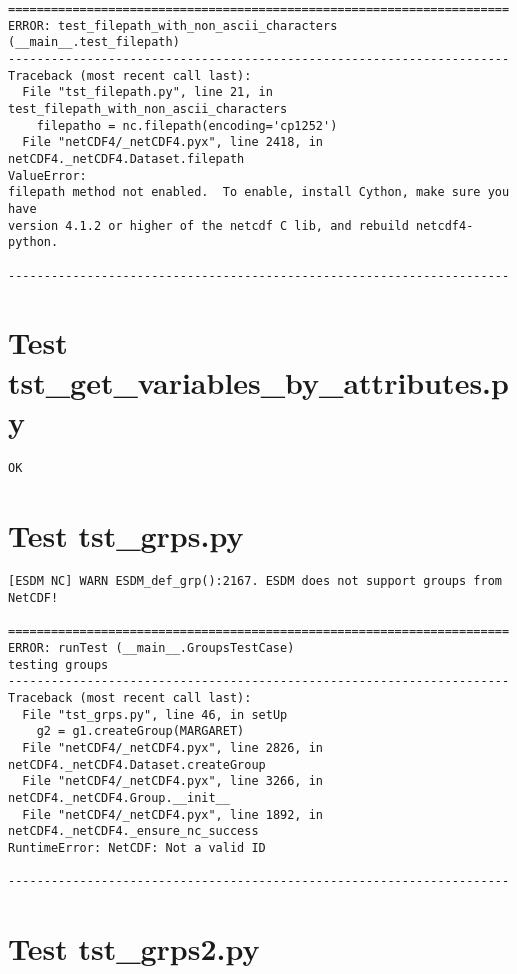 \begin{verbatim}
======================================================================
ERROR: test_filepath_with_non_ascii_characters (__main__.test_filepath)
----------------------------------------------------------------------
Traceback (most recent call last):
  File "tst_filepath.py", line 21, in test_filepath_with_non_ascii_characters
    filepatho = nc.filepath(encoding='cp1252')
  File "netCDF4/_netCDF4.pyx", line 2418, in netCDF4._netCDF4.Dataset.filepath
ValueError:
filepath method not enabled.  To enable, install Cython, make sure you have
version 4.1.2 or higher of the netcdf C lib, and rebuild netcdf4-python.

----------------------------------------------------------------------
\end{verbatim}

\section{Test tst\_get\_variables\_by\_attributes.py}

\begin{verbatim}
OK
\end{verbatim}

\section{Test tst\_grps.py}

\begin{verbatim}
[ESDM NC] WARN ESDM_def_grp():2167. ESDM does not support groups from NetCDF!

======================================================================
ERROR: runTest (__main__.GroupsTestCase)
testing groups
----------------------------------------------------------------------
Traceback (most recent call last):
  File "tst_grps.py", line 46, in setUp
    g2 = g1.createGroup(MARGARET)
  File "netCDF4/_netCDF4.pyx", line 2826, in netCDF4._netCDF4.Dataset.createGroup
  File "netCDF4/_netCDF4.pyx", line 3266, in netCDF4._netCDF4.Group.__init__
  File "netCDF4/_netCDF4.pyx", line 1892, in netCDF4._netCDF4._ensure_nc_success
RuntimeError: NetCDF: Not a valid ID

----------------------------------------------------------------------
\end{verbatim}

\section{Test tst\_grps2.py}

